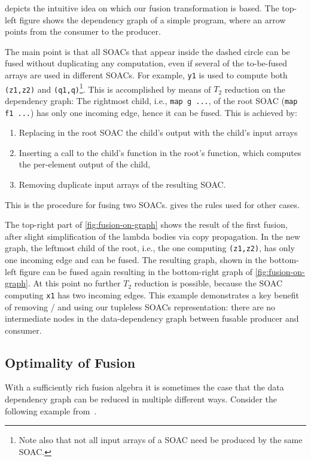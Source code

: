  depicts the intuitive idea on which our
fusion transformation is based.  The top-left figure shows the
dependency graph of a simple program, where an arrow points from the
consumer to the producer.

The main point is that all SOACs that appear inside the dashed circle
can be fused without duplicating any computation, even if several of
the to-be-fused arrays are used in different SOACs.  For example,
\texttt{y1} is used to compute both \texttt{(z1,z2)} and
\texttt{(q1,q)}\footnote{Note also that not all input arrays of a SOAC
  need be produced by the same SOAC.}.  This is accomplished by means
of $T_2$ reduction on the dependency graph: The rightmost child, i.e.,
\lstinline{map g ...}, of the root SOAC (\lstinline{map f1 ...})  has
only one incoming edge, hence it can be fused.  This is achieved by:
\begin{enumerate}
\item Replacing in the root SOAC the child's output with the child's
  input arrays
\item Inserting a call to the child's function in the root's function,
  which computes the per-element output of the child,
\item Removing duplicate input arrays of the resulting SOAC.
\end{enumerate}
This is the procedure for fusing two  SOACs.
 gives the rules used for other cases.

The top-right part of \cref{fig:fusion-on-graph} shows the result of
the first fusion, after slight simplification of the lambda bodies via
copy propagation.  In the new graph, the leftmost child of the root,
i.e., the one computing \texttt{(z1,z2)}, has only one incoming edge
and can be fused.  The resulting graph, shown in the bottom-left
figure can be fused again resulting in the bottom-right graph of
\cref{fig:fusion-on-graph}.  At this point no further $T_2$ reduction
is possible, because the SOAC computing \texttt{x1} has two incoming
edges.  This example demonstrates a key benefit of removing
/ and using our tupleless SOACs representation:
there are no intermediate nodes in the data-dependency graph between
fusable producer and consumer.

\subsection{Optimality of Fusion}

With a sufficiently rich fusion algebra it is sometimes the case that
the data dependency graph can be reduced in multiple different ways.
Consider the following example
from~\cite{Robinson:2014:FFI:2636228.2636235}.

